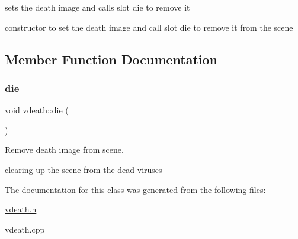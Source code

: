 sets the death image and calls slot die to remove it 

constructor to set the death image and call slot die to remove it from the scene 

\subsection{Member Function Documentation}
\mbox{\label{classvdeath_a36a74d88a906688ff06503b61c57b670}} 
\subsubsection{\texorpdfstring{die}{die}}
{\footnotesize\ttfamily void vdeath\+::die (\begin{DoxyParamCaption}{ }\end{DoxyParamCaption})\hspace{0.3cm}{\ttfamily [slot]}}



Remove death image from scene. 

clearing up the scene from the dead viruses 

The documentation for this class was generated from the following files\+:\begin{DoxyCompactItemize}
\item 
\hyperlink{vdeath_8h}{vdeath.\+h}\item 
vdeath.\+cpp\end{DoxyCompactItemize}
